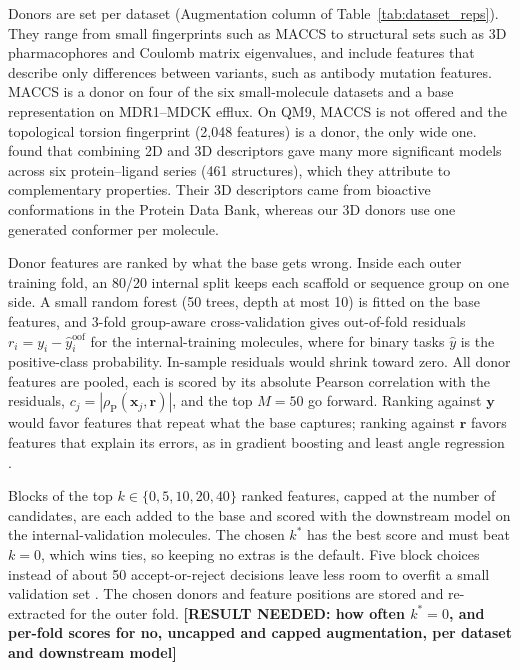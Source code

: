 Donors are set per dataset (Augmentation column of Table~\ref{tab:dataset_reps}). They range from small fingerprints such as MACCS to structural sets such as 3D pharmacophores and Coulomb matrix eigenvalues, and include features that describe only differences between variants, such as antibody mutation features. MACCS is a donor on four of the six small-molecule datasets and a base representation on MDR1--MDCK efflux. On QM9, MACCS is not offered and the topological torsion fingerprint (2,048 features) is a donor, the only wide one. \citet{Bahia2023} found that combining 2D and 3D descriptors gave many more significant models across six protein--ligand series (461 structures), which they attribute to complementary properties. Their 3D descriptors came from bioactive conformations in the Protein Data Bank, whereas our 3D donors use one generated conformer per molecule.

Donor features are ranked by what the base gets wrong. Inside each outer training fold, an 80/20 internal split keeps each scaffold or sequence group on one side. A small random forest (50 trees, depth at most 10) is fitted on the base features, and 3-fold group-aware cross-validation gives out-of-fold residuals $r_i = y_i - \hat{y}^{\mathrm{oof}}_i$ for the internal-training molecules, where for binary tasks $\hat{y}$ is the positive-class probability. In-sample residuals would shrink toward zero. All donor features are pooled, each is scored by its absolute Pearson correlation with the residuals, $c_j = |\rho_{\mathrm{P}}(\mathbf{x}_j, \mathbf{r})|$, and the top $M = 50$ go forward. Ranking against $\mathbf{y}$ would favor features that repeat what the base captures; ranking against $\mathbf{r}$ favors features that explain its errors, as in gradient boosting \citep{friedman2001greedy} and least angle regression \citep{efron2004lars}.

Blocks of the top $k \in \{0, 5, 10, 20, 40\}$ ranked features, capped at the number of candidates, are each added to the base and scored with the downstream model on the internal-validation molecules. The chosen $k^*$ has the best score and must beat $k=0$, which wins ties, so keeping no extras is the default. Five block choices instead of about 50 accept-or-reject decisions leave less room to overfit a small validation set \citep{Cawley2010}. The chosen donors and feature positions are stored and re-extracted for the outer fold. \textbf{[RESULT NEEDED: how often $k^*=0$, and per-fold scores for no, uncapped and capped augmentation, per dataset and downstream model]}

